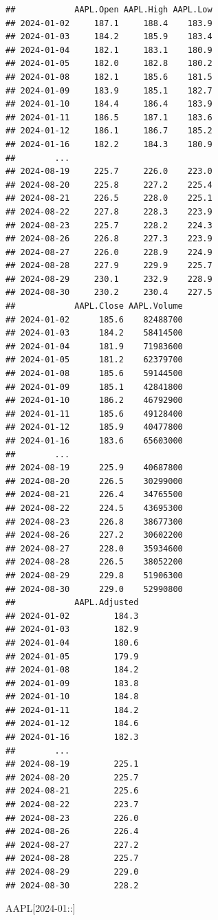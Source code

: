 \documentclass[]{ctexbook}
\newenvironment{Shaded}{\begin{snugshade}}{\end{snugshade}}
\newcommand{\NormalTok}[1]{#1}
\newcommand{\StringTok}[1]{\textcolor[rgb]{0.31,0.60,0.02}{#1}}
\begin{document}
\begin{verbatim}
##            AAPL.Open AAPL.High AAPL.Low
## 2024-01-02     187.1     188.4    183.9
## 2024-01-03     184.2     185.9    183.4
## 2024-01-04     182.1     183.1    180.9
## 2024-01-05     182.0     182.8    180.2
## 2024-01-08     182.1     185.6    181.5
## 2024-01-09     183.9     185.1    182.7
## 2024-01-10     184.4     186.4    183.9
## 2024-01-11     186.5     187.1    183.6
## 2024-01-12     186.1     186.7    185.2
## 2024-01-16     182.2     184.3    180.9
##        ...                             
## 2024-08-19     225.7     226.0    223.0
## 2024-08-20     225.8     227.2    225.4
## 2024-08-21     226.5     228.0    225.1
## 2024-08-22     227.8     228.3    223.9
## 2024-08-23     225.7     228.2    224.3
## 2024-08-26     226.8     227.3    223.9
## 2024-08-27     226.0     228.9    224.9
## 2024-08-28     227.9     229.9    225.7
## 2024-08-29     230.1     232.9    228.9
## 2024-08-30     230.2     230.4    227.5
##            AAPL.Close AAPL.Volume
## 2024-01-02      185.6    82488700
## 2024-01-03      184.2    58414500
## 2024-01-04      181.9    71983600
## 2024-01-05      181.2    62379700
## 2024-01-08      185.6    59144500
## 2024-01-09      185.1    42841800
## 2024-01-10      186.2    46792900
## 2024-01-11      185.6    49128400
## 2024-01-12      185.9    40477800
## 2024-01-16      183.6    65603000
##        ...                       
## 2024-08-19      225.9    40687800
## 2024-08-20      226.5    30299000
## 2024-08-21      226.4    34765500
## 2024-08-22      224.5    43695300
## 2024-08-23      226.8    38677300
## 2024-08-26      227.2    30602200
## 2024-08-27      228.0    35934600
## 2024-08-28      226.5    38052200
## 2024-08-29      229.8    51906300
## 2024-08-30      229.0    52990800
##            AAPL.Adjusted
## 2024-01-02         184.3
## 2024-01-03         182.9
## 2024-01-04         180.6
## 2024-01-05         179.9
## 2024-01-08         184.2
## 2024-01-09         183.8
## 2024-01-10         184.8
## 2024-01-11         184.2
## 2024-01-12         184.6
## 2024-01-16         182.3
##        ...              
## 2024-08-19         225.1
## 2024-08-20         225.7
## 2024-08-21         225.6
## 2024-08-22         223.7
## 2024-08-23         226.0
## 2024-08-26         226.4
## 2024-08-27         227.2
## 2024-08-28         225.7
## 2024-08-29         229.0
## 2024-08-30         228.2
\end{verbatim}

\begin{Shaded}
\begin{Highlighting}[]
\NormalTok{AAPL[}\StringTok{\textquotesingle{}2024{-}01::\textquotesingle{}}\NormalTok{]}
\end{Highlighting}
\end{Shaded}
\end{document}
